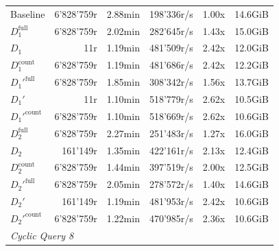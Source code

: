 \begin{longtable}{lrrrrr}
    \nopagebreak
    Baseline              &  6'828'759r           &  2.88min        &  198'336r/s          & 1.00x             & 14.6GiB   \\
    $D_1^{\text{full}}$   &  6'828'759r           &  2.02min        &  282'645r/s          & 1.43x             & 15.0GiB   \\
    \quad $D_1$           &  11r                  &  1.19min        &  481'509r/s          & 2.42x             & 12.0GiB   \\
    $D_1^{\text{count}}$  &  6'828'759r           &  1.19min        &  481'686r/s          & 2.42x             & 12.2GiB   \\
    $D_1'^{\text{full}}$  &  6'828'759r           &  1.85min        &  308'342r/s          & 1.56x             & 13.7GiB   \\
    \quad $D_1'$          &  11r                  &  1.10min        &  518'779r/s          & 2.62x             & 10.5GiB   \\
    $D_1'^{\text{count}}$ &  6'828'759r           &  1.10min        &  518'669r/s          & 2.62x             & 10.6GiB   \\
    $D_2^{\text{full}}$   &  6'828'759r           &  2.27min        &  251'483r/s          & 1.27x             & 16.0GiB   \\
    \quad $D_2$           &  161'149r             &  1.35min        &  422'161r/s          & 2.13x             & 12.4GiB   \\
    $D_2^{\text{count}}$  &  6'828'759r           &  1.44min        &  397'519r/s          & 2.00x             & 12.5GiB   \\
    $D_2'^{\text{full}}$  &  6'828'759r           &  2.05min        &  278'572r/s          & 1.40x             & 14.6GiB   \\
    \quad $D_2'$          &  161'149r             &  1.19min        &  481'953r/s          & 2.42x             & 10.6GiB   \\
    $D_2'^{\text{count}}$ &  6'828'759r           &  1.22min        &  470'985r/s          & 2.36x             & 10.6GiB   \\
    \midrule

    \multicolumn{6}{l}{\textit{Cyclic Query 8}} \\
    \midrule
    

\end{longtable}
